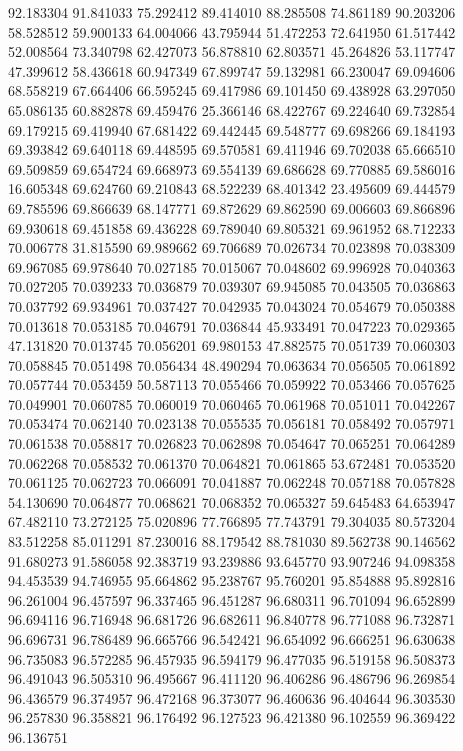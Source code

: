 92.183304
91.841033
75.292412
89.414010
88.285508
74.861189
90.203206
58.528512
59.900133
64.004066
43.795944
51.472253
72.641950
61.517442
52.008564
73.340798
62.427073
56.878810
62.803571
45.264826
53.117747
47.399612
58.436618
60.947349
67.899747
59.132981
66.230047
69.094606
68.558219
67.664406
66.595245
69.417986
69.101450
69.438928
63.297050
65.086135
60.882878
69.459476
25.366146
68.422767
69.224640
69.732854
69.179215
69.419940
67.681422
69.442445
69.548777
69.698266
69.184193
69.393842
69.640118
69.448595
69.570581
69.411946
69.702038
65.666510
69.509859
69.654724
69.668973
69.554139
69.686628
69.770885
69.586016
16.605348
69.624760
69.210843
68.522239
68.401342
23.495609
69.444579
69.785596
69.866639
68.147771
69.872629
69.862590
69.006603
69.866896
69.930618
69.451858
69.436228
69.789040
69.805321
69.961952
68.712233
70.006778
31.815590
69.989662
69.706689
70.026734
70.023898
70.038309
69.967085
69.978640
70.027185
70.015067
70.048602
69.996928
70.040363
70.027205
70.039233
70.036879
70.039307
69.945085
70.043505
70.036863
70.037792
69.934961
70.037427
70.042935
70.043024
70.054679
70.050388
70.013618
70.053185
70.046791
70.036844
45.933491
70.047223
70.029365
47.131820
70.013745
70.056201
69.980153
47.882575
70.051739
70.060303
70.058845
70.051498
70.056434
48.490294
70.063634
70.056505
70.061892
70.057744
70.053459
50.587113
70.055466
70.059922
70.053466
70.057625
70.049901
70.060785
70.060019
70.060465
70.061968
70.051011
70.042267
70.053474
70.062140
70.023138
70.055535
70.056181
70.058492
70.057971
70.061538
70.058817
70.026823
70.062898
70.054647
70.065251
70.064289
70.062268
70.058532
70.061370
70.064821
70.061865
53.672481
70.053520
70.061125
70.062723
70.066091
70.041887
70.062248
70.057188
70.057828
54.130690
70.064877
70.068621
70.068352
70.065327
59.645483
64.653947
67.482110
73.272125
75.020896
77.766895
77.743791
79.304035
80.573204
83.512258
85.011291
87.230016
88.179542
88.781030
89.562738
90.146562
91.680273
91.586058
92.383719
93.239886
93.645770
93.907246
94.098358
94.453539
94.746955
95.664862
95.238767
95.760201
95.854888
95.892816
96.261004
96.457597
96.337465
96.451287
96.680311
96.701094
96.652899
96.694116
96.716948
96.681726
96.682611
96.840778
96.771088
96.732871
96.696731
96.786489
96.665766
96.542421
96.654092
96.666251
96.630638
96.735083
96.572285
96.457935
96.594179
96.477035
96.519158
96.508373
96.491043
96.505310
96.495667
96.411120
96.406286
96.486796
96.269854
96.436579
96.374957
96.472168
96.373077
96.460636
96.404644
96.303530
96.257830
96.358821
96.176492
96.127523
96.421380
96.102559
96.369422
96.136751
